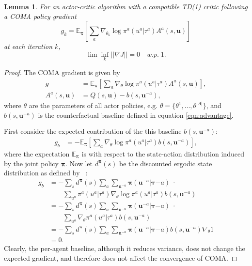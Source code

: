 \documentclass[letterpaper]{article}
\newcommand{\citet}[1]{\citeauthor{#1}~\shortcite{#1}}
\newcommand{\myvec}[1]{\mathbf{#1}}
\newcommand{\myvecsym}[1]{\boldsymbol{#1}}
\newcommand{\vpi}{\myvecsym{\pi}}
\newcommand{\vtau}{\myvecsym{\tau}}
\newcommand{\vu}{\myvec{u}}
\newcommand{\E}{\mathbb{E}}
\newtheorem{lemma}{Lemma}
\begin{document}
\begin{lemma}
For an actor-critic algorithm with a compatible TD(1) critic following a COMA 
policy gradient
\begin{equation}
g_k = \E_{\vpi} \left[ \sum_a \nabla_{\theta_k} \log
\pi^a(u^a | \tau^a)
A^a(s,\vu) \right]
\end{equation}
at each iteration $k$,
\begin{equation}
\lim \inf_k ||\nabla J|| = 0 \quad w.p. \; 1.
\end{equation}
\end{lemma}
\begin{proof}
The COMA gradient is given by
\begin{align}
g &= \E_{\vpi} \left[ \sum_a \nabla_{\theta} \log
\pi^a(u^a | \tau^a)
A^a(s,\vu) \right], \\
A^a(s,\vu)
&= Q(s, \vu) - b(s, \vu^{-a}),
\end{align}
where $\theta$ are the parameters of all actor policies, e.g. $\theta = 
\{\theta^1,\ldots,\theta^{|A|}\}$, and $b(s, \vu^{-a})$ is the counterfactual 
baseline defined in equation \ref{eqn:advantage}.

First consider the expected contribution of the this baseline $b(s, 
\vu^{-a})$:
\begin{align}
g_b &= - \E_{\vpi} \left[\sum_a \nabla_\theta \log \pi^a(u^a | \tau^a)
b(s, \vu^{-a})
\right],
\end{align}
where the expectation $\E_{\vpi}$ is with respect to the state-action 
distribution 
induced by the joint policy $\vpi$. Now let $d^{\vpi}(s)$ be the discounted 
ergodic state distribution as defined by \citet{sutton1999policy}:
\begin{align}
g_b &= - \sum_s d^{\vpi}(s) \sum_a \sum_{\vu^{-a}} 
\vpi(\vu^{-a}|\vtau{-a}) \; \cdot \nonumber\\
&\qquad \sum_{u^a} 
\pi^a(u^a|\tau^a)  \nabla_\theta \log \pi^a(u^a | \tau^a)
b(s, \vu^{-a})\\
&= - \sum_s d^{\vpi}(s) \sum_a \sum_{\vu^{-a}} \vpi(\vu^{-a}|\vtau{-a})  \; 
\cdot \nonumber \\
&\qquad \sum_{u^a} 
\nabla_\theta \pi^a(u^a | \tau^a)
b(s, \vu^{-a}) \\
&= - \sum_s d^{\vpi}(s) \sum_a \sum_{\vu^{-a}} \vpi(\vu^{-a}|\vtau{-a}) 
b(s, \vu^{-a}) \nabla_\theta 1 \nonumber\\
&= 0.
\end{align}
Clearly, the per-agent baseline, although it reduces variance, does not change 
the expected gradient, and 
therefore does not affect the convergence of COMA. 


\end{proof}
\end{document}
